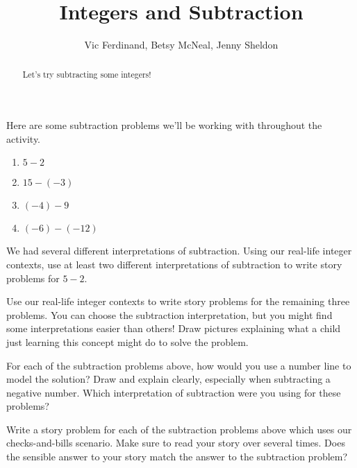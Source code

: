\documentclass[nooutcomes]{ximera}
\title{Integers and Subtraction}
\author{Vic Ferdinand, Betsy McNeal, Jenny Sheldon}
\begin{document}
\begin{abstract}
    Let's try subtracting some integers!
\end{abstract}
\maketitle



Here are some subtraction problems we'll be working with throughout the activity.

\begin{enumerate}
    \item $5 - 2$
    \item $15 - (-3)$
    \item $(-4) - 9$
    \item $(-6) - (-12)$
\end{enumerate}

\begin{problem}
We had several different interpretations of subtraction.  Using our real-life integer contexts, use at least two different interpretations of subtraction to write story problems for $5 - 2$.

\end{problem}

\begin{problem}
Use our real-life integer contexts to write story problems for the remaining three problems.  You can choose the subtraction interpretation, but you might find some interpretations easier than others!  Draw pictures explaining what a child just learning this concept might do to solve the problem.


\end{problem}

\begin{problem}
For each of the subtraction problems above, how would you use a number line to model the solution?  Draw and explain clearly, especially when subtracting a negative number.  Which interpretation of subtraction were you using for these problems?
\end{problem}

\begin{problem}
Write a story problem for each of the subtraction problems above which uses our checks-and-bills scenario.  Make sure to read your story over several times.  Does the sensible answer to your story match the answer to the subtraction problem?
\end{problem}
\end{document}
